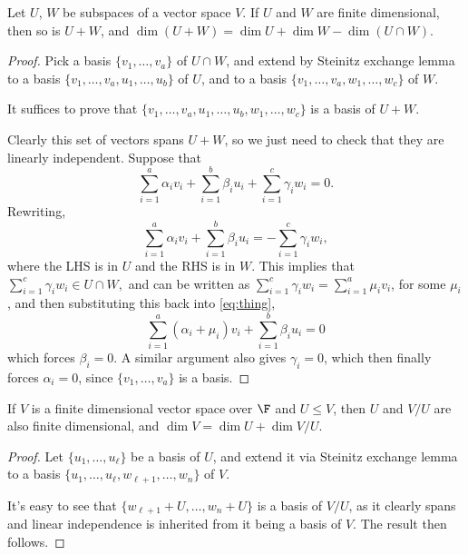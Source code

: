 \begin{proposition}
    Let $U$, $W$ be subspaces of a vector space $V$. If $U$ and $W$ are finite dimensional, then so is $U + W$, and $\dim (U + W) = \dim U + \dim W - \dim (U \cap W)$.
\end{proposition}
\begin{proof}
    Pick a basis $\{v_1, \dots, v_a\}$ of $U \cap W$, and extend by Steinitz exchange lemma to a basis $\{v_1, \dots, v_a, u_1, \dots, u_b\}$ of $U$, and to a basis $\{v_1, \dots, v_a, w_1, \dots, w_c\}$ of $W$.
    
    It suffices to prove that $\{v_1, \dots, v_a, u_1, \dots, u_b, w_1, \dots, w_c\}$ is a basis of $U + W$.

    Clearly this set of vectors spans $U + W$, so we just need to check that they are linearly independent. Suppose that
    $$
    \sum_{i = 1}^{a} \alpha_i v_i + \sum_{i = 1}^b \beta_i u_i + \sum_{i = 1}^c \gamma_i w_i = 0.
    $$
    Rewriting,
    \begin{equation}\label{eq:thing}
        \sum_{i = 1}^{a} \alpha_i v_i + \sum_{i = 1}^b \beta_i u_i = -\sum_{i = 1}^c \gamma_i w_i, \tag{$\dagger$}
    \end{equation}
    where the LHS is in $U$ and the RHS is in $W$. This implies that
    $
    \sum_{i = 1}^c \gamma_i w_i \in U \cap W,
    $
    and can be written as 
    $
    \sum_{i = 1}^c \gamma_i w_i = \sum_{i = 1}^a  \mu_i v_i$,
    for some $\mu_i$, and then substituting this back into \eqref{eq:thing},
    $$
    \sum_{i = 1}^a (\alpha_i + \mu_i) v_i + \sum_{i = 1}^b \beta_i u_i = 0
    $$
    which forces $\beta_i = 0$. A similar argument also gives $\gamma_i = 0$, which then finally forces $\alpha_i = 0$, since $\{v_1, \dots, v_a\}$ is a basis.
\end{proof}

\begin{proposition}
    If $V$ is a finite dimensional vector space over $\F$ and $U \leq V$, then $U$ and $V / U$ are also finite dimensional, and $\dim V = \dim U + \dim V / U$.
\end{proposition}
\begin{proof}
    Let $\{u_1, \dots, u_\ell\}$ be a basis of $U$, and extend it via Steinitz exchange lemma to a basis $\{u_1, \dots, u_\ell, w_{\ell+1}, \dots, w_n\}$ of $V$.

    It's easy to see that $\{w_{\ell + 1} + U, \dots, w_{n} + U\}$ is a basis of $V/U$, as it clearly spans and linear independence is inherited from it being a basis of $V$. The result then follows.
\end{proof}

